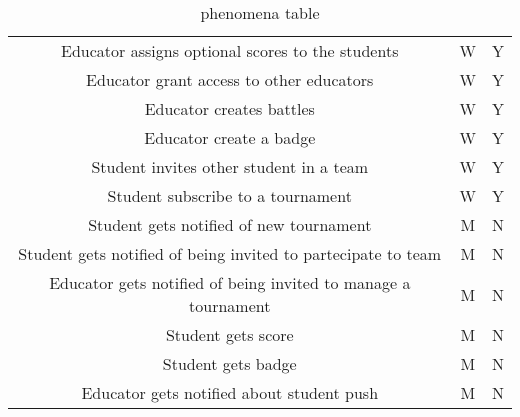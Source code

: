 \documentclass{article}
\begin{document}
\begin{center}
\begin{table}
\begin{tabularx}{\textwidth}{| c| c| c|}
            Educator assigns optional scores to the students                      & W                & Y          \\
            Educator grant access to other educators                              & W                & Y          \\
            Educator creates battles                                              & W                & Y          \\
            Educator create a badge                                               & W                & Y          \\
            Student invites other student in a team                               & W                & Y          \\
            Student subscribe to a tournament                                     & W                & Y          \\
            Student gets notified of new tournament                               & M                & N          \\
            Student gets notified of being invited to partecipate to team         & M                & N          \\
            Educator gets notified of being invited to manage a tournament        & M                & N          \\
            Student gets score                                                    & M                & N          \\
            Student gets badge                                                    & M                & N          \\
            Educator gets notified about student push                             & M                & N          \\

            \hline
        \end{tabularx}
        \caption{phenomena table}
    \end{table}
\end{center}
\end{document}
